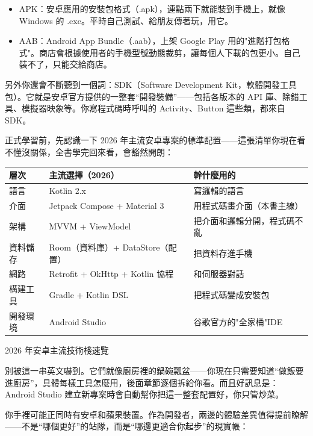 \begin{itemize}
  \item APK：安卓應用的安裝包格式（.apk），連點兩下就能裝到手機上，就像 Windows 的 .exe。平時自己測試、給朋友傳著玩，用它。
  \item AAB：Android App Bundle（.aab），上架 Google Play 用的"進階打包格式"。商店會根據使用者的手機型號動態裁剪，讓每個人下載的包更小。自己裝不了，只能交給商店。
\end{itemize}

另外你還會不斷聽到一個詞：SDK（Software Development Kit，軟體開發工具包）。它就是安卓官方提供的一整套“開發裝備”——包括各版本的 API 庫、除錯工具、模擬器映象等。你寫程式碼時呼叫的 Activity、Button 這些類，都來自 SDK。


正式學習前，先認識一下 2026 年主流安卓專案的標準配置——這張清單你現在看不懂沒關係，全書學完回來看，會豁然開朗：

\begin{center}
\begin{tabularx}{\linewidth}{|X|X|X|}
\hline
\textbf{層次} & \textbf{主流選擇（2026）} & \textbf{幹什麼用的} \tabularnewline
\hline
語言 & Kotlin 2.x & 寫邏輯的語言 \tabularnewline
介面 & Jetpack Compose + Material 3 & 用程式碼畫介面（本書主線） \tabularnewline
架構 & MVVM + ViewModel & 把介面和邏輯分開，程式碼不亂 \tabularnewline
資料儲存 & Room（資料庫）+ DataStore（配置） & 把資料存進手機 \tabularnewline
網路 & Retrofit + OkHttp + Kotlin 協程 & 和伺服器對話 \tabularnewline
構建工具 & Gradle + Kotlin DSL & 把程式碼變成安裝包 \tabularnewline
開發環境 & Android Studio & 谷歌官方的"全家桶"IDE \tabularnewline
\hline
\end{tabularx}
\end{center}

\begin{center}\small\color{gray}2026 年安卓主流技術棧速覽\end{center}

別被這一串英文嚇到。它們就像廚房裡的鍋碗瓢盆——你現在只需要知道“做飯要進廚房”，具體每樣工具怎麼用，後面章節逐個拆給你看。而且好訊息是：Android Studio 建立新專案時會自動幫你把這一整套配置好，你只管炒菜。


你手裡可能正同時有安卓和蘋果裝置。作為開發者，兩邊的體驗差異值得提前瞭解——不是“哪個更好”的站隊，而是“哪邊更適合你起步”的現實帳：

